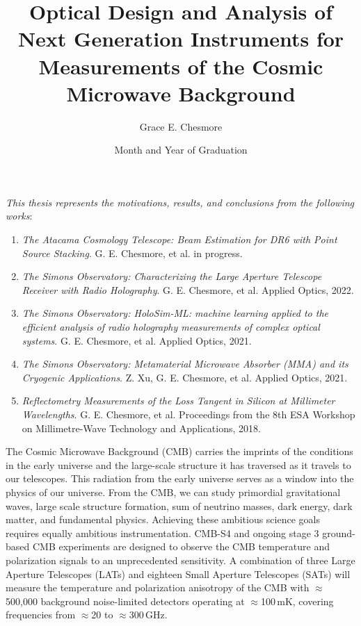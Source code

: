 \documentclass{ucetd}
\title{Optical Design and Analysis of Next Generation Instruments for Measurements of the Cosmic Microwave Background
}
\author{Grace E. Chesmore}
\date{Month and Year of Graduation}  %
\begin{document}
\maketitle

\makecopyright

\tableofcontents
\cleardoublepage
{}
\listoffigures
\cleardoublepage
{}
\listoftables
\newpage

\begin{center}
    \textit{This thesis represents the motivations, results, and conclusions from the following works}:
    \\
    \begin{enumerate}
        \item[\cite{act_ptsrc}] \textit{The Atacama Cosmology Telescope: Beam Estimation for DR6 with Point Source Stacking}. G. E. Chesmore, et al. in progress.
        \item[\cite{chesmore2022}] \textit{The Simons Observatory: Characterizing the Large Aperture Telescope Receiver with Radio Holography}. G. E. Chesmore, et al. Applied Optics, 2022.
        \item[\cite{Chesmore:21}] \textit{The Simons Observatory: HoloSim-ML: machine learning applied to the efficient analysis of radio holography measurements of complex optical systems}. G. E. Chesmore, et al. Applied Optics, 2021.
        \item[\cite{Xu_2021}] \textit{The Simons Observatory: Metamaterial Microwave Absorber (MMA) and its Cryogenic Applications}. Z. Xu, G. E. Chesmore, et al. Applied Optics, 2021.
        \item[\cite{ches18}] \textit{Reflectometry Measurements of the Loss Tangent in Silicon at Millimeter Wavelengths}. G. E. Chesmore, et al. Proceedings from the 8th ESA Workshop on Millimetre-Wave Technology and Applications, 2018.
    \end{enumerate}

\end{center}
\newpage

\abstract
The Cosmic Microwave Background (CMB) carries the imprints of the conditions in the early universe and the large-scale structure it has traversed as it travels to our telescopes. This radiation from the early universe serves as a window into the physics of our universe. From the CMB, we can study primordial gravitational waves, large scale structure formation, sum of neutrino masses, dark energy, dark matter, and fundamental physics. Achieving these ambitious science goals requires equally ambitious instrumentation.
CMB-S4 and ongoing stage 3 ground-based CMB experiments are designed to observe the CMB temperature and polarization signals to an unprecedented sensitivity. A combination of three Large Aperture Telescopes (LATs) and eighteen Small Aperture Telescopes (SATs) will measure the temperature and polarization anisotropy of the CMB with $\approx$500,000 background noise-limited detectors operating at $\approx$100\,mK, covering frequencies from $\approx$20 to $\approx$300\,GHz.
\end{document}
